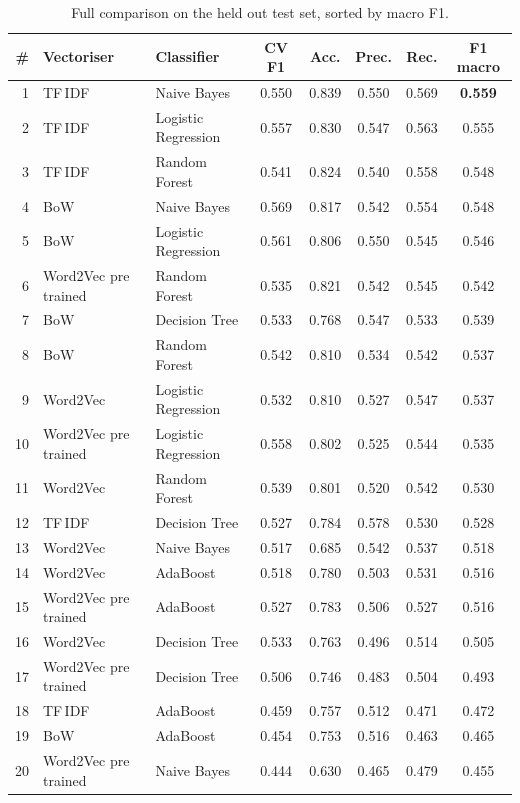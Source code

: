 \documentclass[11pt,a4paper]{article}
\begin{document}
\begin{table}[H]
\centering
\small
\begin{tabular}{rllccccc}
\toprule
\# & \textbf{Vectoriser} & \textbf{Classifier} & \textbf{CV F1} & \textbf{Acc.} & \textbf{Prec.} & \textbf{Rec.} & \textbf{F1 macro} \\
\midrule
1  & TF\,IDF & Naive Bayes & 0.550 & 0.839 & 0.550 & 0.569 & \textbf{0.559} \\
2  & TF\,IDF & Logistic Regression & 0.557 & 0.830 & 0.547 & 0.563 & 0.555 \\
3  & TF\,IDF & Random Forest & 0.541 & 0.824 & 0.540 & 0.558 & 0.548 \\
4  & BoW & Naive Bayes & 0.569 & 0.817 & 0.542 & 0.554 & 0.548 \\
5  & BoW & Logistic Regression & 0.561 & 0.806 & 0.550 & 0.545 & 0.546 \\
6  & Word2Vec pre trained & Random Forest & 0.535 & 0.821 & 0.542 & 0.545 & 0.542 \\
7  & BoW & Decision Tree & 0.533 & 0.768 & 0.547 & 0.533 & 0.539 \\
8  & BoW & Random Forest & 0.542 & 0.810 & 0.534 & 0.542 & 0.537 \\
9  & Word2Vec & Logistic Regression & 0.532 & 0.810 & 0.527 & 0.547 & 0.537 \\
10 & Word2Vec pre trained & Logistic Regression & 0.558 & 0.802 & 0.525 & 0.544 & 0.535 \\
11 & Word2Vec & Random Forest & 0.539 & 0.801 & 0.520 & 0.542 & 0.530 \\
12 & TF\,IDF & Decision Tree & 0.527 & 0.784 & 0.578 & 0.530 & 0.528 \\
13 & Word2Vec & Naive Bayes & 0.517 & 0.685 & 0.542 & 0.537 & 0.518 \\
14 & Word2Vec & AdaBoost & 0.518 & 0.780 & 0.503 & 0.531 & 0.516 \\
15 & Word2Vec pre trained & AdaBoost & 0.527 & 0.783 & 0.506 & 0.527 & 0.516 \\
16 & Word2Vec & Decision Tree & 0.533 & 0.763 & 0.496 & 0.514 & 0.505 \\
17 & Word2Vec pre trained & Decision Tree & 0.506 & 0.746 & 0.483 & 0.504 & 0.493 \\
18 & TF\,IDF & AdaBoost & 0.459 & 0.757 & 0.512 & 0.471 & 0.472 \\
19 & BoW & AdaBoost & 0.454 & 0.753 & 0.516 & 0.463 & 0.465 \\
20 & Word2Vec pre trained & Naive Bayes & 0.444 & 0.630 & 0.465 & 0.479 & 0.455 \\
\bottomrule
\end{tabular}
\caption{Full comparison on the held out test set, sorted by macro F1.}
\end{table}
\end{document}

